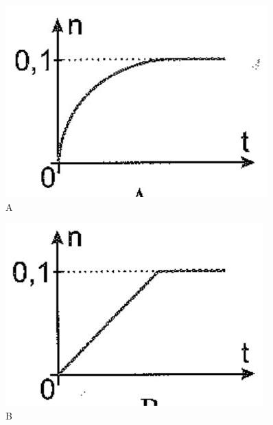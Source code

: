 \documentclass[10pt]{article}
\begin{document}
\begin{figure}[h]
\begin{center}
  \includegraphics[width=\textwidth]{2025_10_23_74efce88ce3a451fd6b0g-004}
\captionsetup{labelformat=empty}
\caption{A}
\end{center}
\end{figure}

\begin{figure}[h]
\begin{center}
  \includegraphics[width=\textwidth]{2025_10_23_74efce88ce3a451fd6b0g-004(2)}
\captionsetup{labelformat=empty}
\caption{B}
\end{center}
\end{figure}
\end{document}
